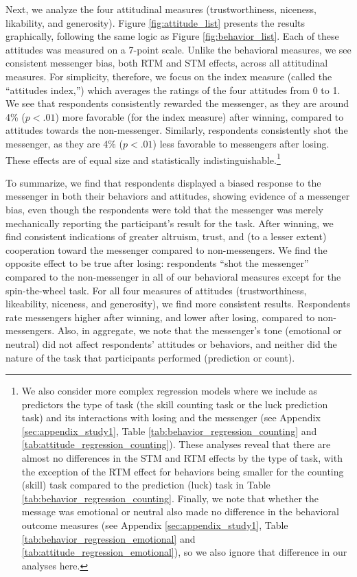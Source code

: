 Next, we analyze the four attitudinal measures (trustworthiness,
niceness, likability, and generosity). Figure \ref{fig:attitude_list} presents the results
graphically, following the same logic as Figure \ref{fig:behavior_list}. Each of these
attitudes was measured on a 7-point scale. Unlike the behavioral
measures, we see consistent messenger bias, both RTM and STM effects,
across all attitudinal measures. For simplicity, therefore, we focus on
the index measure (called the ``attitudes index,'') which averages the
 ratings of the four attitudes from 0 to 1. We
see that respondents consistently rewarded the messenger, as they are
around 4\% ($p < .01$) more favorable (for the
index measure) after winning, compared to attitudes towards the
non-messenger. Similarly, respondents consistently shot the messenger,
as they are 4\% ($p < .01$) less favorable to
messengers after losing. These effects are of equal size and
statistically indistinguishable.\footnote{We also consider more complex regression models where we include as predictors the type of task (the skill counting task or the luck prediction task) and its interactions with losing and the messenger (see Appendix \ref{sec:appendix_study1}, Table \ref{tab:behavior_regression_counting} and \ref{tab:attitude_regression_counting}). These analyses reveal that there are almost no differences in the STM and RTM effects by the type of task, with the exception of the RTM effect for behaviors being smaller for the counting (skill) task compared to the prediction (luck) task in Table \ref{tab:behavior_regression_counting}. Finally, we note that whether the message was emotional or neutral also made no difference in the behavioral outcome measures (see Appendix \ref{sec:appendix_study1}, Table \ref{tab:behavior_regression_emotional} and \ref{tab:attitude_regression_emotional}), so we also ignore that difference in our analyses here.}

To summarize, we find that respondents displayed a biased response to
the messenger in both their behaviors and attitudes, showing evidence of
a messenger bias, even though the respondents were told that the
messenger was merely mechanically reporting the participant's result for
the task. After winning, we find consistent indications of greater
altruism, trust, and (to a lesser extent) cooperation toward the
messenger compared to non-messengers. We find the opposite effect to be
true after losing: respondents ``shot the messenger'' compared to the
non-messenger in all of our behavioral measures except for the
spin-the-wheel task. For all four measures of attitudes
(trustworthiness, likeability, niceness, and generosity), we find more
consistent results. Respondents rate messengers higher after winning, and
lower after losing, compared to non-messengers. Also, in aggregate, we
note that the messenger's tone (emotional or neutral) did not affect
respondents' attitudes or behaviors, and neither did the nature of the
task that participants performed (prediction or count).

